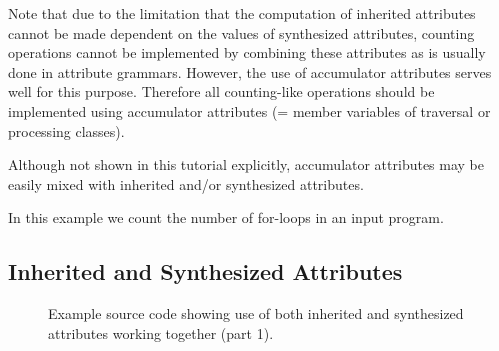 Note that due to the limitation that the computation of inherited attributes cannot be made dependent on the values of synthesized attributes, counting operations cannot be implemented by combining these attributes as is usually done in attribute grammars. However, the use of accumulator attributes serves well for this purpose. Therefore all counting-like operations should be implemented using accumulator attributes (= member variables of traversal or processing classes).

     Although not shown in this tutorial explicitly, accumulator attributes
may be easily mixed with inherited and/or synthesized attributes.

In this example we count the number of for-loops in an input program.







\subsection{Inherited and Synthesized Attributes}

\begin{figure}[!h]
{\indent
{\mySmallestFontSize


\begin{latexonly}
   
%  
\end{latexonly}

\begin{htmlonly}
   
\end{htmlonly}

}
}
\caption{Example source code showing use of both inherited and synthesized attributes
         working together (part 1).}
\label{Tutorial:exampleInheritedAndSynthesizedAttributeTraversal-part1}
\end{figure}


